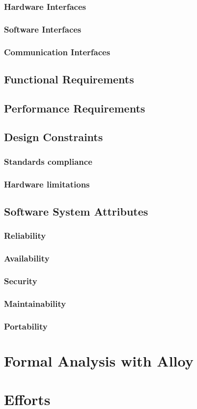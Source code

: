 \documentclass{article}
\begin{document}
\subsubsection{Hardware Interfaces}
\subsubsection{Software Interfaces}
\subsubsection{Communication Interfaces}

\subsection{Functional Requirements}

\subsection{Performance Requirements}

\subsection{Design Constraints}
\subsubsection{Standards compliance}
\subsubsection{Hardware limitations}

\subsection{Software System Attributes}
\subsubsection{Reliability}
\subsubsection{Availability}
\subsubsection{Security}
\subsubsection{Maintainability}
\subsubsection{Portability}

\section{Formal Analysis with Alloy}

\section{Efforts}




    
\end{document}

